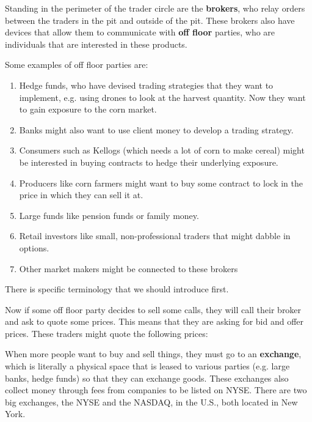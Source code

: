 \documentclass{article}
\begin{document}
    Standing in the perimeter of the trader circle are the \textbf{brokers}, who relay orders between the traders in the pit and outside of the pit. These brokers also have devices that allow them to communicate with \textbf{off floor} parties, who are individuals that are interested in these products. 

    \begin{example}
      Some examples of off floor parties are: 
      \begin{enumerate}
        \item Hedge funds, who have devised trading strategies that they want to implement, e.g. using drones to look at the harvest quantity. Now they want to gain exposure to the corn market. 
        \item Banks might also want to use client money to develop a trading strategy. 
        \item Consumers such as Kellogs (which needs a lot of corn to make cereal) might be interested in buying contracts to hedge their underlying exposure. 
        \item Producers like corn farmers might want to buy some contract to lock in the price in which they can sell it at. 
        \item Large funds like pension funds or family money. 
        \item Retail investors like small, non-professional traders that might dabble in options.  
        \item Other market makers might be connected to these brokers
      \end{enumerate}
    \end{example}

    There is specific terminology that we should introduce first. 

    \begin{definition}
      
    \end{definition}
    Now if some off floor party decides to sell some calls, they will call their broker and ask to quote some prices. This means that they are asking for bid and offer prices. These traders might quote the following prices: 



    When more people want to buy and sell things, they must go to an \textbf{exchange}, which is literally a physical space that is leased to various parties (e.g. large banks, hedge funds) so that they can exchange goods. These exchanges also collect money through fees from companies to be listed on NYSE. There are two big exchanges, the NYSE and the NASDAQ, in the U.S., both located in New York. 
\end{document}
